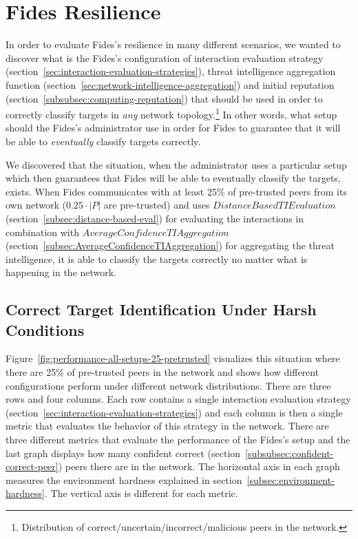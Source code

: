 \newpage
\section{Fides Resilience}
\label{sec:fides-resilience}

In order to evaluate Fides's resilience in many different scenarios, we wanted to discover what is the Fides's configuration of interaction evaluation strategy (section~\ref{sec:interaction-evaluation-strategies}), threat intelligence aggregation function (section~\ref{sec:network-intelligence-aggregation}) and initial reputation (section~\ref{subsubsec:computing-reputation}) that should be used in order to correctly classify targets in \textit{any} network topology.\footnote{Distribution of correct/uncertain/incorrect/malicious peers in the network.}
In other words, what setup should the Fides's administrator use in order for Fides to guarantee that it will be able to \textit{eventually} classify targets correctly.

We discovered that the situation, when the administrator uses a particular setup which then guarantees that Fides will be able to eventually classify the targets, exists. When Fides communicates with at least 25\% of pre-trusted peers from its own network ($0.25 \cdot |P|$ are pre-trusted) and uses $DistanceBasedTIEvaluation$ (section~\ref{subsec:distance-based-eval}) for evaluating the interactions in combination with $AverageConfidenceTIAggregation$ (section~\ref{subsec:AverageConfidenceTIAggregation}) for aggregating the threat intelligence, it is able to classify the targets correctly no matter what is happening in the network.

\subsection{Correct Target Identification Under Harsh Conditions}
\label{subsec:correct-target-identification-no-matter-what}

Figure~\ref{fig:performance-all-setups-25-pretrusted} visualizes this situation where there are 25\% of pre-trusted peers in the network and shows how different configurations perform under different network distributions.
There are three rows and four columns. Each row contains a single interaction evaluation strategy (section~\ref{sec:interaction-evaluation-strategies}) and each column is then a single metric that evaluates the behavior of this strategy in the network.
There are three different metrics that evaluate the performance of the Fides's setup and the last graph displays how many confident correct (section~\ref{subsubsec:confident-correct-peer}) peers there are in the network.
The horizontal axis in each graph measures the environment hardness explained in section~\ref{subsec:environment-hardness}.
The vertical axis is different for each metric.

